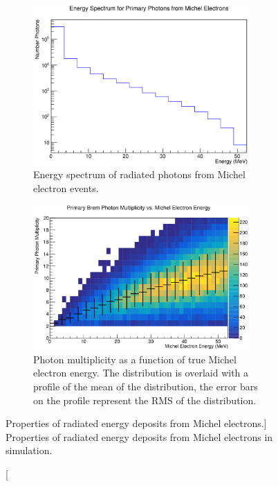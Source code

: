 \begin{figure}

	\centering

	\begin{subfigure}[b]{\textwidth}
		\centering
		\includegraphics[width=0.9\textwidth]{figures/photon_spec.pdf}
		\caption{Energy spectrum of radiated photons from Michel electron events.}
		\label{fig:photon_spec}
	\end{subfigure}

	\vspace{5mm}

	\begin{subfigure}[b]{\textwidth}
		\centering
		\includegraphics[width=0.9\textwidth]{figures/photon_mult.pdf}
		\caption{Photon multiplicity as a function of true Michel electron energy.
		The distribution is overlaid with a profile of the mean of the distribution,
		the error bars on the profile represent the RMS of the distribution.}
		\label{fig:photon_mult}
	\end{subfigure}

	\caption
	[Properties of radiated energy deposits from Michel electrons.]
	{Properties of radiated energy deposits from Michel electrons in \protodune{}
	simulation.}

	\label{fig:photon_prop}

\end{figure}

